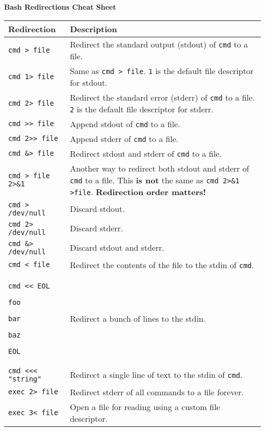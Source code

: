 \documentclass{article}
\begin{document}
\begin{center}
\Large \textbf{Bash Redirections Cheat Sheet}
\end{center}

\vspace{0.1in}

\renewcommand{\arraystretch}{1.2}
\begin{tabular}{|m{5.5cm}|m{12.2cm}|}
\hline
\large\textbf{Redirection} & \large\textbf{Description} \\
\hline
\verb|cmd > file| & Redirect the standard output (stdout) of \verb|cmd| to a file. \\
\hline
\verb|cmd 1> file| & Same as \verb|cmd > file|. \verb|1| is the default file descriptor for stdout. \\
\hline
\verb|cmd 2> file| & Redirect the standard error (stderr) of \verb|cmd| to a file. \verb|2| is the default file descriptor for stderr. \\
\hline
\verb|cmd >> file| & Append stdout of \verb|cmd| to a file. \\
\hline
\verb|cmd 2>> file| & Append stderr of \verb|cmd| to a file. \\
\hline
\verb|cmd &> file| & Redirect stdout and stderr of \verb|cmd| to a file. \\
\hline
\verb|cmd > file 2>&1| & Another way to redirect both stdout and stderr of \verb|cmd| to a file. This \textbf{is not} the same as \verb|cmd 2>&1 >file|. \textbf{Redirection order matters!} \\
\hline
\verb|cmd > /dev/null| & Discard stdout. \\
\hline
\verb|cmd 2> /dev/null| & Discard stderr. \\
\hline
\verb|cmd &> /dev/null| & Discard stdout and stderr. \\
\hline
\verb|cmd < file| & Redirect the contents of the file to the stdin of \verb|cmd|. \\
\hline
\verb|cmd << EOL| \par
\verb|foo| \par
\verb|bar| \par
\verb|baz| \par
\verb|EOL| & Redirect a bunch of lines to the stdin. \\
\hline
\verb|cmd <<< "string"| & Redirect a single line of text to the stdin of \verb|cmd|. \\
\hline
\verb|exec 2> file| & Redirect stderr of all commands to a file forever. \\
\hline
\verb|exec 3< file| & Open a file for reading using a custom file descriptor. \\

\end{tabular}
\end{document}
